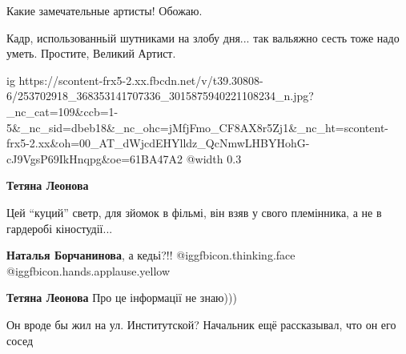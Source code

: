  
 
 
 
 



Какие замечательные артисты! Обожаю.


Кадр, использованньій шутниками на злобу дня... так вальяжно сесть тоже надо
уметь. Простите, Великий Артист.

\ifcmt
  ig https://scontent-frx5-2.xx.fbcdn.net/v/t39.30808-6/253702918_368353141707336_3015875940221108234_n.jpg?_nc_cat=109&ccb=1-5&_nc_sid=dbeb18&_nc_ohc=jMfjFmo_CF8AX8r5Zj1&_nc_ht=scontent-frx5-2.xx&oh=00_AT_dWjcdEHYlldz_QcNmwLHBYHohG-cJ9VgsP69IkHnqpg&oe=61BA47A2
  @width 0.3
\fi

\textbf{Тетяна Леонова} 

Цей \enquote{куций} светр, для зйомок в фільмі, він
взяв у свого племінника, а не в гардеробі кіностудії...

\textbf{Наталья Борчанинова},
а кедьі?!!  @igg{fbicon.thinking.face}  @igg{fbicon.hands.applause.yellow} 

\textbf{Тетяна Леонова} Про це інформації не знаю)))


Он вроде бы жил на ул. Институтской? Начальник ещё рассказывал, что он его сосед

